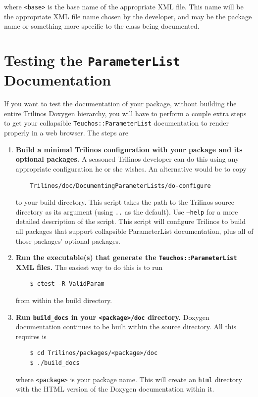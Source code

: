 \documentclass[pdf,ps2pdf,12pt]{smemo}
\begin{document}
\begin{memo}
\begin{enumerate}
 where \texttt{<base>} is the base name of the appropriate XML file.
 This name will be the appropriate XML file name chosen by the
 developer, and may be the package name or something more specific to
 the class being documented.

\end{enumerate}

\section{Testing the \texttt{ParameterList} Documentation}
\label{sec:testing}

If you want to test the documentation of your package, without
building the entire Trilinos Doxygen hierarchy, you will have to
perform a couple extra steps to get your collapsible
\texttt{Teuchos::ParameterList} documentation to render properly in a
web browser.  The steps are

 \begin{enumerate}
   \item \textbf{Build a minimal Trilinos configuration with your
       package and its optional packages.}  A seasoned Trilinos
     developer can do this using any appropriate configuration he or she
     wishes.  An alternative would be to copy
\begin{verbatim}
    Trilinos/doc/DocumentingParameterLists/do-configure
\end{verbatim}
     to your build directory.  This script takes the path to the
     Trilinos source directory as its argument (using \texttt{..} as
     the default).  Use \texttt{--help} for a more detailed
     description of the script.  This script will configure Trilinos
     to build all packages that support collapsible ParameterList
     documentation, plus all of those packages' optional packages.

    \item \textbf{Run the executable(s) that generate the
        \texttt{Teuchos::ParameterList} XML files.}  The easiest way to
      do this is to run
\begin{verbatim}
    $ ctest -R ValidParam
\end{verbatim}
      from within the build directory.

    \item \textbf{Run \texttt{build\_docs} in your
        \texttt{<package>/doc} directory.}  Doxygen documentation
      continues to be built within the source directory.  All this
      requires is
\begin{verbatim}
    $ cd Trilinos/packages/<package>/doc
    $ ./build_docs
\end{verbatim}
      where \texttt{<package>} is your package name.  This will create
      an \texttt{html} directory with the HTML version of the Doxygen
      documentation within it.


\end{enumerate}
\end{memo}
\end{document}
